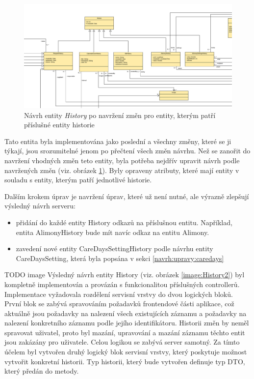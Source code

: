         \begin{figure}\centering
	        \includegraphics[width=1.0\textwidth]{pdfs/History1_2}
	        \caption[Návrh entity History po změnách návrhu]{Návrh entity \textit{History} po navržení změn pro entity, kterým patří příslušné entity historie}\label{image:History1_2}
        \end{figure}
        Tato entita byla implementována jako poslední a všechny změny, které se ji týkají, jsou srozumitelné jenom po přečtení všech změn návrhu. Než se zanořit do navržení vhodných změn teto entity, byla potřeba nejdřív upravit návrh podle navržených změn (viz. obrázek \ref{image:History1_2}). Byly opraveny atributy, které mají entity v souladu s entity, kterým patří jednotlivé historie.
        
        Dalším krokem úprav je navržení úprav, které už není nutné, ale výrazně zlepšují výsledný návrh serveru:
        \begin{itemize}
            \item přidání do každé entity History odkazů na příslušnou entitu. Například, entita AlimonyHistory bude mít navíc odkaz na entitu Alimony.
            \item zavedení nové entity CareDaysSettingHistory podle návrhu entity CareDaysSetting, která byla popsána v sekci \ref{navrh:upravy:caredays}
        \end{itemize}
         TODO image
        Výsledný návrh entity History (viz. obrázek \ref{image:History2}) byl kompletně implementován a provázán s funkcionalitou příslušných controllerů. Implementace vyžadovala rozdělení servisní vrstvy do dvou logických bloků. První blok se zabývá spravováním požadavků frontendové části aplikace, což aktuálně jsou požadavky na nalezení všech existujících záznamu a požadavky na nalezení konkretního záznamu podle jejího identifikátoru. Historii změn by neměl spravovat uživatel, proto byl mazání, upravování a mazání záznamu těchto entit jsou zakázány pro uživatele. Celou logikou se zabývá server samotný. Za tímto účelem byl vytvořen druhý logický blok servisní vrstvy, který poskytuje možnost vytvořit konkretní historii. Typ historii, který bude vytvořen definuje typ DTO, který předán do metody.

